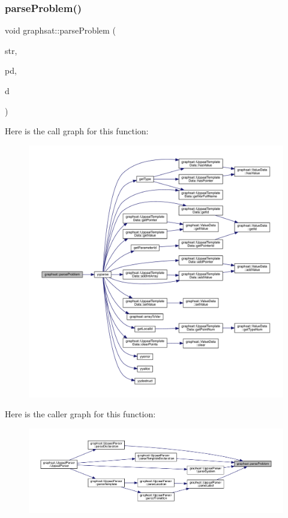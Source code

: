 \subsubsection{\texorpdfstring{parseProblem()}{parseProblem()}}
{\footnotesize\ttfamily void graphsat\+::parse\+Problem (\begin{DoxyParamCaption}\item[{const string \&}]{str,  }\item[{\mbox{\hyperlink{classgraphsat_1_1_uppaal_template_data}{Uppaal\+Template\+Data}} $\ast$}]{pd,  }\item[{\mbox{\hyperlink{classgraphsat_1_1_uppaal_template_data}{Uppaal\+Template\+Data}} $\ast$}]{d }\end{DoxyParamCaption})}

Here is the call graph for this function\+:
\nopagebreak
\begin{figure}[H]
\begin{center}
\leavevmode
\includegraphics[width=350pt]{namespacegraphsat_a7fe53bf89583dc8ec90c6669b17f8b6d_cgraph}
\end{center}
\end{figure}
Here is the caller graph for this function\+:
\nopagebreak
\begin{figure}[H]
\begin{center}
\leavevmode
\includegraphics[width=350pt]{namespacegraphsat_a7fe53bf89583dc8ec90c6669b17f8b6d_icgraph}
\end{center}
\end{figure}
\mbox{\label{namespacegraphsat_a767ef8183b8eada3700a18101d3444a8}} 
